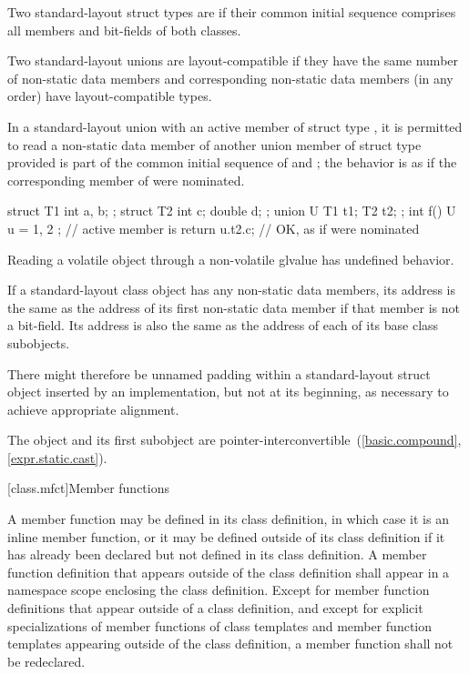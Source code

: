\pnum
Two standard-layout struct types are
 if
their common initial sequence comprises all members and bit-fields of
both classes.

\pnum
Two standard-layout unions are layout-compatible if they
have the same number of non-static data members and corresponding
non-static data members (in any order) have layout-compatible
types.

\pnum
In a standard-layout union with an active member
of struct type , it is permitted to read a non-static
data member  of another union member of struct type 
provided  is part of the common initial sequence of  and ;
the behavior is as if the corresponding member of  were nominated.
\begin{example}
\begin{codeblock}
struct T1 { int a, b; };
struct T2 { int c; double d; };
union U { T1 t1; T2 t2; };
int f() {
  U u = { { 1, 2 } };   // active member is 
  return u.t2.c;        // OK, as if  were nominated
}
\end{codeblock}
\end{example}
\begin{note}
\setlength{\emergencystretch}{1em}
Reading a volatile object through a non-volatile glvalue has
undefined behavior.
\end{note}

\pnum
If a standard-layout class object has any non-static data members, its address
is the same as the address of its first non-static data member
if that member is not a bit-field. Its
address is also the same as the address of each of its base class subobjects.
\begin{note}
There might therefore be unnamed padding within a standard-layout struct object
inserted by an implementation, but
not at its beginning, as necessary to achieve appropriate alignment.
\end{note}
\begin{note}
The object and its first subobject are
pointer-interconvertible~(\ref{basic.compound}, \ref{expr.static.cast}).
\end{note}

[class.mfct]{Member functions}%

\pnum
{}%
%
A member function may be defined in its class
definition, in which case it is an inline member
function, or it may be defined outside of its class
definition if it has already been declared but not defined in its class
definition. A member function definition that appears outside of the
class definition shall appear in a namespace scope enclosing the class
definition. Except for member function definitions that appear outside
of a class definition, and except for explicit specializations of member
functions of class templates and member function
templates appearing outside of the class definition, a
member function shall not be redeclared.

